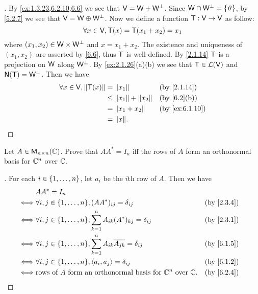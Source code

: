 \begin{proof}[]
	By \cref{ex:1.3.23,6.2.10,6.6} we see that \(\mathsf{V} = \mathsf{W} + \mathsf{W}^{\perp}\).
	Since \(\mathsf{W} \cap \mathsf{W}^{\perp} = \left\lbrace\mathit{0}\right\rbrace\), by \cref{5.2.7} we see that \(\mathsf{V} = \mathsf{W} \oplus \mathsf{W}^{\perp}\).
	Now we define a function \(\mathsf{T} : \mathsf{V} \to \mathsf{V}\) as follow:
	\[
		\forall x \in \mathsf{V}, \mathsf{T}(x) = \mathsf{T}(x_1 + x_2) = x_1
	\]
	where \((x_1, x_2) \in \mathsf{W} \times \mathsf{W}^{\perp}\) and \(x = x_1 + x_2\).
	The existence and uniqueness of \((x_1, x_2)\) are asserted by \cref{6.6}, thus \(\mathsf{T}\) is well-defined.
	By \cref{2.1.14} \(\mathsf{T}\) is a projection on \(\mathsf{W}\) along \(\mathsf{W}^{\perp}\).
	By \cref{ex:2.1.26}(a)(b) we see that \(\mathsf{T} \in \mathcal{L}(\mathsf{V})\) and \(\ns{\T} = \W^{\perp}\).
	Then we have
	\begin{align*}
		\forall x \in \V, \norm{\T(x)} & = \norm{x_1}                 &  & \by{2.1.14}    \\
		                               & \leq \norm{x_1} + \norm{x_2} &  & \by{6.2}[b]    \\
		                               & = \norm{x_1 + x_2}           &  & \by{ex:6.1.10} \\
		                               & = \norm{x}.
	\end{align*}
\end{proof}

\begin{ex}\label{ex:6.2.11}
	Let \(A \in \ms[n][n][\C]\).
	Prove that \(AA^* = I_n\) iff the rows of \(A\) form an orthonormal basis for \(\mathbb{C}^n\) over \(\mathbb{C}\).
\end{ex}

\begin{proof}[]
	For each \(i \in \left\lbrace1, \dots, n\right\rbrace\), let \(a_i\) be the \(i\)th row of \(A\).
	Then we have
	\begin{align*}
		     & AA^* = I_n                                                                                               \\
		\iff & \forall i, j \in \set{1, \dots, n}, (AA^*)_{i j} = \delta_{i j}                          &  & \by{2.3.4} \\
		\iff & \forall i, j \in \set{1, \dots, n}, \sum_{k = 1}^n A_{i k} (A^*)_{k j} = \delta_{i j}    &  & \by{2.3.1} \\
		\iff & \forall i, j \in \set{1, \dots, n}, \sum_{k = 1}^n A_{i k} \conj{A_{j k}} = \delta_{i j} &  & \by{6.1.5} \\
		\iff & \forall i, j \in \set{1, \dots, n}, \inn{a_i, a_j} = \delta_{i j}                        &  & \by{6.1.2} \\
		\iff & \text{rows of } A \text{ form an orthonormal basis for } \C^n \text{ over } \C.          &  & \by{6.2.4}
	\end{align*}
\end{proof}

